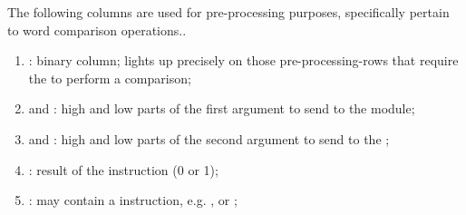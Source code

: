 The following columns are used for pre-processing purposes, specifically pertain to word comparison operations..
\begin{enumerate}[resume]
      \item \ppWcpFlag:
            binary column;
            lights up precisely on those pre-processing-rows that require the \wcpMod{} to perform a comparison;
      \item \ppWcpArgOneHi{} and \ppWcpArgOneLo{}:
            high and low parts of the first argument to send to the \wcpMod{} module;
      \item \ppWcpArgTwoHi{} and \ppWcpArgTwoLo{}:
            high and low parts of the second argument to send to the \wcpMod;
      \item \ppWcpRes:
            result of the instruction (0 or 1);
      \item \ppWcpInst:
            may contain a \wcpMod{} instruction, e.g. ,  or ;
\end{enumerate}
